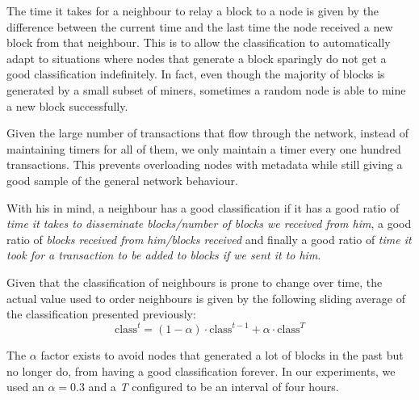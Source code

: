 \documentclass{dads}   %
\begin{document}
The time it takes for a neighbour to relay a block to a node is given by the difference between the current time and the last time the node received a new block from that neighbour. 
This is to allow the classification to automatically adapt to situations where nodes that generate a block sparingly do not get a good classification indefinitely.
In fact, even though the majority of blocks is generated by a small subset of miners, sometimes a random node is able to mine a new block successfully.

Given the large number of transactions that flow through the network, instead of maintaining timers for all of them, we only maintain a timer every one hundred transactions. This prevents overloading nodes with metadata while still giving a good sample of the general network behaviour. 




With his in mind, a neighbour has a good classification if it has a good ratio of \textsl{time it takes to disseminate blocks/number of blocks we received from him}, a good ratio of \textsl{blocks received from him/blocks received} and finally a good ratio of \textsl{time it took for a transaction to be added to blocks if we sent it to him}.

Given that the classification of neighbours is prone to change over time, the actual value used to order neighbours is given by the following sliding average of the classification presented previously:
\begin{displaymath} \mbox{class}^t = (1-\alpha) \cdot \mbox{class}^{t-1} + \alpha \cdot \mbox{class}^{T} \end{displaymath}

The $\alpha$ factor exists to avoid nodes that generated a lot of blocks in the past but no longer do, from having a good classification forever. In our experiments, we used an $\alpha=0.3$ and a \textit{T} configured to be an interval of four hours.
\end{document}
